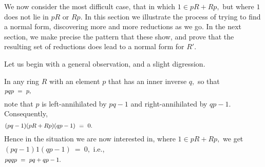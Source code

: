 \documentclass{amsart}
\begin{document}
We now consider the most difficult case, that in which
$1\in pR+Rp,$ but where $1$ does not lie in $pR$ or $Rp.$
In this section we illustrate the process of trying to find
a normal form, discovering more and more reductions as we go.
In the next section, we make precise the pattern that these
show, and prove that the resulting set of reductions does
lead to a normal form for $R'.$

Let us begin with a general observation, and a slight digression.

In any ring $R$ with an element $p$ that
has an inner inverse $q,$ so that
\begin{equation}\begin{minipage}[c]{35pc}\label{d.1=:pqp}
$pqp\ =\ p,$
\end{minipage}\end{equation}
note that
$p$ is left-annihilated by $pq-1$ and right-annihilated by $qp-1.$
Consequently,
\begin{equation}\begin{minipage}[c]{35pc}\label{d.1=:pq-1*qp-1}
$(pq-1)(pR+Rp)(qp-1)\ =\ 0.$
\end{minipage}\end{equation}
Hence in the situation we are now interested in,
where $1\in pR+Rp,$ we get $(pq-1)1(qp-1)\ =\ 0,$ i.e.,
\begin{equation}\begin{minipage}[c]{35pc}\label{d.1=:pqqp}
$pqqp\ =\ pq + qp - 1.$
\end{minipage}\end{equation}
\end{document}
